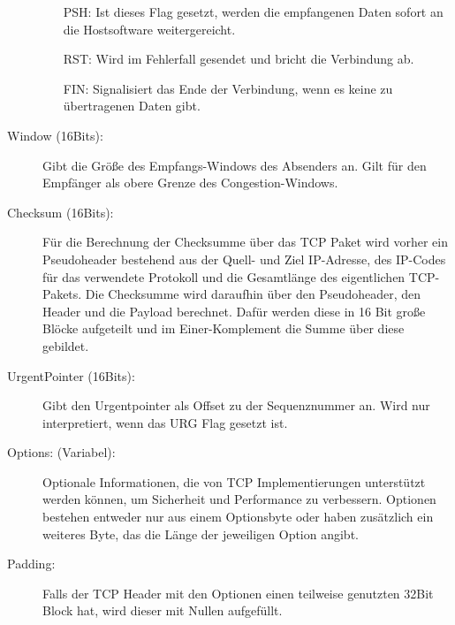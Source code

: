 \begin{description}
\begin{itemize}
\item[PSH: ] Ist dieses Flag gesetzt, werden die empfangenen Daten sofort an die Hostsoftware weitergereicht. 
\item[RST: ] Wird im Fehlerfall gesendet und bricht die Verbindung ab. 
\item[FIN: ] Signalisiert das Ende der Verbindung, wenn es keine zu übertragenen Daten gibt. 
\end{itemize}
\item[Window (16Bits): ] Gibt die Größe des Empfangs-Windows des Absenders an. Gilt für den Empfänger als obere Grenze des Congestion-Windows.
\item[Checksum (16Bits): ] Für die Berechnung der Checksumme über das TCP Paket wird vorher ein Pseudoheader bestehend aus der Quell- und Ziel IP-Adresse, des IP-Codes für das verwendete Protokoll und die Gesamtlänge des eigentlichen TCP-Pakets. Die Checksumme wird daraufhin über den Pseudoheader, den Header und die Payload berechnet. Dafür werden diese in 16 Bit große Blöcke aufgeteilt und im Einer-Komplement die Summe über diese gebildet. 
\item[UrgentPointer (16Bits): ] Gibt den Urgentpointer als Offset zu der Sequenznummer an. Wird nur interpretiert, wenn das URG Flag gesetzt ist.\
\item[Options: (Variabel): ]  Optionale Informationen, die von TCP Implementierungen unterstützt werden können, um Sicherheit und Performance zu verbessern. Optionen bestehen entweder nur aus einem Optionsbyte oder haben zusätzlich ein weiteres Byte, das die Länge der jeweiligen Option angibt. 
\item[Padding: ] Falls der TCP Header mit den Optionen einen teilweise genutzten 32Bit Block hat, wird dieser mit Nullen aufgefüllt. 
\end{description}
